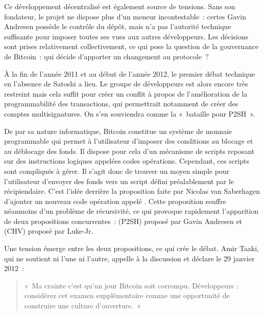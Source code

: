
Ce développement décentralisé est également source de tensions. Sans son fondateur, le projet ne dispose plus d'un meneur incontestable~: certes Gavin Andresen possède le contrôle du dépôt, mais n'a pas l'autorité technique suffisante pour imposer toutes ses vues aux autres développeurs. Les décisions sont prises relativement collectivement, ce qui pose la question de la gouvernance de Bitcoin~: qui décide d'apporter un changement au protocole~?

À la fin de l'année 2011 et au début de l'année 2012, le premier débat technique en l'absence de Satoshi a lieu. Le groupe de développeurs est alors encore très restreint mais cela suffit pour créer un conflit à propos de l'amélioration de la programmabilité des transactions, qui permettrait notamment de créer des comptes multisignatures. On s'en souviendra comme la «~bataille pour P2SH~».

De par sa nature informatique, Bitcoin constitue un système de monnaie programmable qui permet à l'utilisateur d'imposer des conditions au blocage et au déblocage des fonds. Il dispose pour cela d'un mécanisme de scripts reposant sur des instructions logiques appelées codes opérations. Cependant, ces scripts sont compliqués à gérer. Il s'agit donc de trouver un moyen simple pour l'utilisateur d'envoyer des fonds vers un script défini préalablement par le récipiendaire. C'est l'idée derrière la proposition faite par Nicolas van Saberhagen d'ajouter un nouveau code opération appelé . Cette proposition souffre néanmoins d'un problème de récursivité, ce qui provoque rapidement l'apparition de deux propositions concurrentes~:  (P2SH) proposé par Gavin Andresen et  (CHV) proposé par Luke-Jr.

Une tension émerge entre les deux propositions, ce qui crée le débat. Amir Taaki, qui ne soutient ni l'une ni l'autre, appelle à la discussion et déclare le 29 janvier 2012~:

\begin{quote}
«~Ma crainte c'est qu'un jour Bitcoin soit corrompu. Développeurs : considérez cet examen supplémentaire comme une opportunité de construire une culture d'ouverture.~»
\end{quote} 

